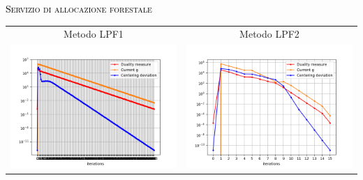\begin{frame}{\textsc{\LARGE \textcolor{black}{Servizio di allocazione forestale}}}
	\centering
	\begin{tabular}{c@{}c}
		\small{Metodo LPF1} & \small{Metodo LPF2} \\
		\includegraphics[scale = 0.33]{for_LPF1}
		&\includegraphics[scale = 0.33]{for_LPF2}\\ 
	\end{tabular}
\end{frame}

